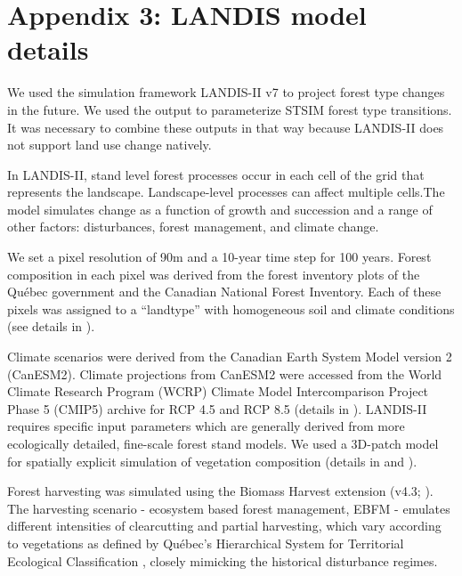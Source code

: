 
\chapter*{\textbf{Appendix 3: LANDIS model details \\ \hspace{1em}}}

\setcounter{chapter}{5}
\setcounter{table}{0}
\setcounter{figure}{0}

We used the simulation framework LANDIS-II v7 \citep{scheller_forest_2004} to project forest type changes in the future. We used the output to parameterize STSIM forest type transitions. It was necessary to combine these outputs in that way because LANDIS-II does not support land use change natively.

In LANDIS-II, stand level forest processes occur in each cell of the grid that represents the landscape. Landscape-level processes can affect multiple cells.The model simulates change as a function of growth and succession and a range of other factors: disturbances, forest management, and climate change. 

We set a pixel resolution of 90m and a 10-year time step for 100 years. Forest composition in each pixel was derived from the forest inventory plots of the Québec government and the Canadian National Forest Inventory. Each of these pixels was assigned to a “landtype” with homogeneous soil and climate conditions (see details in \cite{boulanger_climate_2019}).

Climate scenarios were derived from the Canadian Earth System Model version 2 (CanESM2). Climate projections from CanESM2 were accessed from the World Climate Research Program (WCRP) Climate Model Intercomparison Project Phase 5 (CMIP5) archive for RCP 4.5 and RCP 8.5 (details in \cite{boulanger_climate_2019}).
LANDIS-II requires specific input parameters which are generally derived from more ecologically detailed, fine-scale forest stand models. We used a 3D-patch model for spatially explicit simulation of vegetation composition (details in \cite{lexer_modified_2001} and \cite{tremblay_harvesting_2018}).

Forest harvesting was simulated using the Biomass Harvest extension (v4.3; \cite{gustafson_spatial_2000}). The harvesting scenario - ecosystem based forest management, EBFM - emulates different intensities of clearcutting and partial harvesting, which vary according to vegetations as defined by Québec’s Hierarchical System for Territorial Ecological Classification \citep{bergeron_quebec_1992}, closely mimicking the historical disturbance regimes.